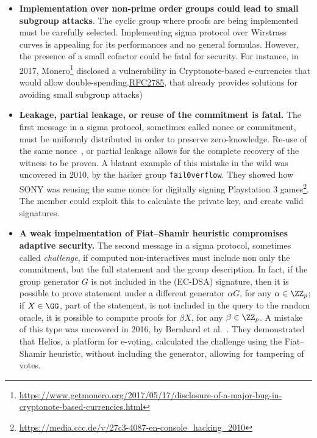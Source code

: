 \documentclass[runningheads]{llncs}
\begin{document}
\begin{itemize}
  \item \textbf{Implementation over non-prime order groups could lead to small subgroup attacks}. The cyclic group where proofs are being implemented must be carefully selected. Implementing sigma protocol over Wirstrass curves is appealing for its performances and no general formulas. However, the presence of a small cofactor could be fatal for security. For instance, in 2017, Monero\footnote{\url{https://www.getmonero.org/2017/05/17/disclosure-of-a-major-bug-in-cryptonote-based-currencies.html}} disclosed a vulnerability in Cryptonote-based e-currencies that would allow double-spending.\href{https://tools.ietf.org/html/rfc2785#ref-LAW}{RFC2785}, that already provides solutions for avoiding small subgroup attacks)
  \item \textbf{Leakage, partial leakage, or reuse of the commitment is fatal.}
  The first message in a sigma protocol, sometimes called nonce or commitment, must be uniformly distributed in order to preserve zero-knowledge. Re-use of the same nonce~\cite{XX}, or partial leakage allows for the complete recovery of the witness to be proven.
  A blatant example of this mistake in the wild was uncovered in 2010, by the hacker group \texttt{fail0verflow}. They showed how SONY was reusing the same nonce for digitally signing Playstation 3 games\footnote{\url{https://media.ccc.de/v/27c3-4087-en-console_hacking_2010}}.  The member could exploit this to calculate the private key, and create valid signatures.

  \item \textbf{A weak impelmentation of Fiat--Shamir heuristic compromises adaptive security.} The second message in a sigma protocol, sometimes called \emph{challenge}, if computed non-interactives must include non only the commitment, but the full statement and the group description. In fact, if the group generator $G$ is not included in the (EC-DSA) signature, then it is possible to prove statement under a different generator $\alpha G$, for any $\alpha \in \ZZ_p$; if $X \in \GG$, part of the statement, is not included in the query to the random oracle, it is possible to compute proofs for $\beta X$, for any $\beta \in \ZZ_p$.
  A mistake of this type was uncovered in 2016, by Bernhard et al.~\cite{??}.
  They demonstrated that Helios, a platform for e-voting, calculated the challenge using the Fiat--Shamir heuristic, without including the generator, allowing for tampering of votes.

\end{itemize}
\end{document}
